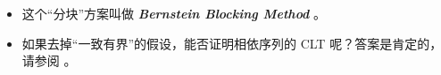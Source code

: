 \begin{remark}

\begin{itemize}
\tightlist
\item
  这个``分块''方案叫做 \textbf{\emph{Bernstein Blocking Method}} 。
\item
  如果去掉``一致有界''的假设，能否证明相依序列的 CLT 呢？答案是肯定的，请参阅 \cite{janson2021}。
\end{itemize}
\end{remark}
